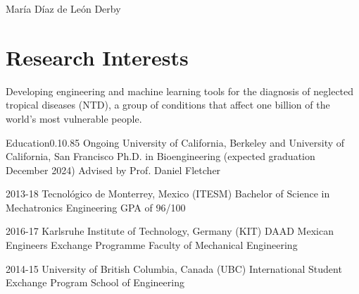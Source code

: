 \documentclass{federico_cv}
\begin{document}
\contact
{María Díaz de León Derby}
{} %
{} %



\section{Research Interests}
Developing engineering and machine learning tools for the diagnosis of neglected tropical diseases (NTD), a group of conditions that affect one billion of the world's most vulnerable people.


\begin{tblSection}{Education}{0.1}{0.85}
\degree
{Ongoing}
{University of California, Berkeley and University of California, San Francisco}
{Ph.D. in Bioengineering (expected graduation December 2024)}
{Advised by Prof. Daniel Fletcher}

\degree
{2013-18}
{Tecnológico de Monterrey, Mexico (ITESM)}
{Bachelor of Science in Mechatronics Engineering}
{GPA of 96/100}

\degree
{2016-17}
{Karlsruhe Institute of Technology, Germany (KIT)}
{DAAD Mexican Engineers Exchange Programme}
{Faculty of Mechanical Engineering}

\degree
{2014-15}
{University of British Columbia, Canada (UBC)}
{International Student Exchange Program}
{School of Engineering}

\end{tblSection}
\end{document}
